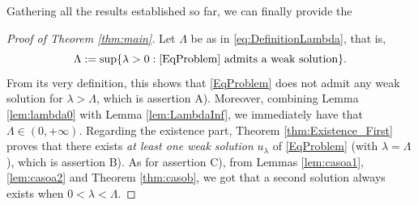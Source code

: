 \documentclass[11pt]{amsart}
\numberwithin{equation}{section} %
\newtheorem{lemma}[teo]{Lemma}
\theoremstyle{definition}
\begin{document}
\medskip


Gathering all the results established so far, we can finally provide the
\begin{proof}[Proof of Theorem \ref{thm:main}]
	Let $\Lambda$ be as in \eqref{eq:DefinitionLambda}, that is, 
    $$\Lambda := \sup \{ \lambda >0: \eqref{EqProblem} \textrm{ admits a weak solution}\}.$$
    From its very definition, this shows that \eqref{EqProblem}
    does not admit any weak solution for $\lambda > \Lambda$, which is assertion A).
    Moreover, combining Lemma \ref{lem:lambda0} with Lemma \ref{lem:LambdaInf}, we immediately have that $\Lambda\in (0,+\infty)$.
    Regarding the existence part, Theorem \ref{thm:Existence_First} proves that 
    there exists \emph{at least one weak solution} $u_\lambda$ of
    \eqref{EqProblem} (with $\lambda =\Lambda$), which is assertion B).
    As for assertion C),
    from Lemmas  \ref{lem:casoa1}, \ref{lem:casoa2}  and Theorem \ref{thm:casob},
    we got that a second
    solution always exists when $0<\lambda<\Lambda$.
\end{proof}
\medskip
\end{document}
